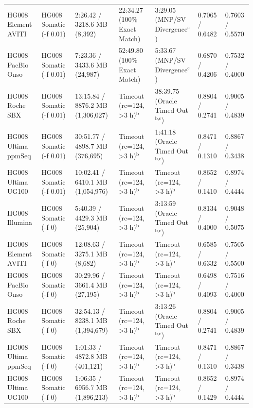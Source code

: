 \begin{table}[htbp]
{\begin{tabular}{lllllll}
HG008 Element AVITI & HG008 Somatic (-f 0.01) & 2:26.42 / 3218.6 MB (8,392) & 22:34.27 (100\% Exact Match) & 3:29.05 (MNP/SV Divergence$^{\text{c}}$) & 0.7065 / 0.6482 & 0.7603 / 0.5570 \\
HG008 PacBio Onso & HG008 Somatic (-f 0.01) & 7:23.36 / 3433.6 MB (24,987) & 52:49.80 (100\% Exact Match) & 5:33.67 (MNP/SV Divergence$^{\text{c}}$) & 0.6870 / 0.4206 & 0.7532 / 0.4000 \\
HG008 Roche SBX & HG008 Somatic (-f 0.01) & 13:15.84 / 8876.2 MB (1,306,027) & Timeout (rc=124, \textgreater{}3 h)$^{\text{b}}$ & 38:39.75 (Oracle Timed Out$^{\text{b,c}}$) & 0.8804 / 0.2741 & 0.9005 / 0.4839 \\
HG008 Ultima ppmSeq & HG008 Somatic (-f 0.01) & 30:51.77 / 4898.7 MB (376,695) & Timeout (rc=124, \textgreater{}3 h)$^{\text{b}}$ & 1:41:18 (Oracle Timed Out$^{\text{b,c}}$) & 0.8471 / 0.1310 & 0.8867 / 0.3438 \\
HG008 Ultima UG100 & HG008 Somatic (-f 0.01) & 10:02.41 / 6410.1 MB (1,054,976) & Timeout (rc=124, \textgreater{}3 h)$^{\text{b}}$ & Timeout (rc=124, \textgreater{}3 h)$^{\text{b}}$ & 0.8652 / 0.1410 & 0.8974 / 0.4444 \\
HG008 Illumina & HG008 Somatic (-f 0) & 5:40.39 / 4429.3 MB (25,904) & Timeout (rc=124, \textgreater{}3 h)$^{\text{b}}$ & 3:13:59 (Oracle Timed Out$^{\text{b,c}}$) & 0.8134 / 0.4000 & 0.9048 / 0.5075 \\
HG008 Element AVITI & HG008 Somatic (-f 0) & 12:08.63 / 3275.1 MB (8,682) & Timeout (rc=124, \textgreater{}3 h)$^{\text{b}}$ & Timeout (rc=124, \textgreater{}3 h)$^{\text{b}}$ & 0.6585 / 0.6332 & 0.7505 / 0.5500 \\
HG008 PacBio Onso & HG008 Somatic (-f 0) & 30:29.96 / 3661.4 MB (27,195) & Timeout (rc=124, \textgreater{}3 h)$^{\text{b}}$ & Timeout (rc=124, \textgreater{}3 h)$^{\text{b}}$ & 0.6498 / 0.4093 & 0.7516 / 0.4000 \\
HG008 Roche SBX & HG008 Somatic (-f 0) & 32:54.13 / 8238.1 MB (1,394,679) & Timeout (rc=124, \textgreater{}3 h)$^{\text{b}}$ & 3:13:26 (Oracle Timed Out$^{\text{b,c}}$) & 0.8804 / 0.2741 & 0.9005 / 0.4839 \\
HG008 Ultima ppmSeq & HG008 Somatic (-f 0) & 1:01:33 / 4872.8 MB (401,121) & Timeout (rc=124, \textgreater{}3 h)$^{\text{b}}$ & Timeout (rc=124, \textgreater{}3 h)$^{\text{b}}$ & 0.8471 / 0.1310 & 0.8867 / 0.3438 \\
HG008 Ultima UG100 & HG008 Somatic (-f 0) & 1:06:35 / 6956.7 MB (1,896,213) & Timeout (rc=124, \textgreater{}3 h)$^{\text{b}}$ & Timeout (rc=124, \textgreater{}3 h)$^{\text{b}}$ & 0.8652 / 0.1429 & 0.8974 / 0.4444 \\

\end{tabular}}
\end{table}
